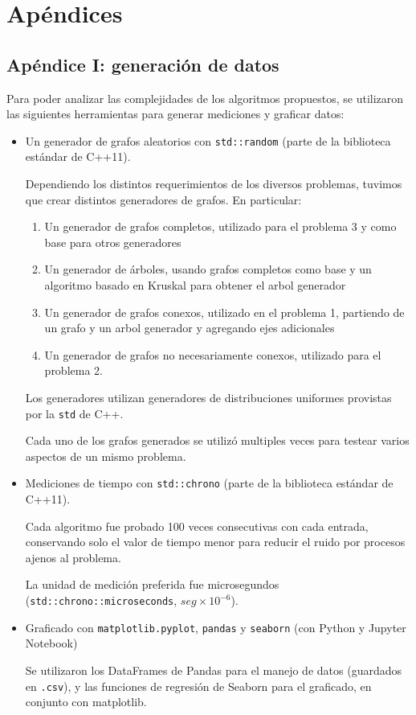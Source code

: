 \section{Apéndices}
	\subsection{Apéndice I: generación de datos}
	Para poder analizar las complejidades de los algoritmos propuestos, se utilizaron las siguientes herramientas para generar mediciones y graficar datos:

	\begin{itemize}
		\item Un generador de grafos aleatorios con \texttt{std::random} (parte de la biblioteca estándar de C++11).

		Dependiendo los distintos requerimientos de los diversos problemas, tuvimos que crear distintos generadores de grafos. En particular:

		\begin{enumerate}
			\item Un generador de grafos completos, utilizado para el problema 3 y como base para otros generadores
			\item Un generador de árboles, usando grafos completos como base y un algoritmo basado en Kruskal para obtener el arbol generador
			\item Un generador de grafos conexos, utilizado en el problema 1, partiendo de un grafo y un arbol generador y agregando ejes adicionales
			\item Un generador de grafos no necesariamente conexos, utilizado para el problema 2.
		\end{enumerate}

		Los generadores utilizan generadores de distribuciones uniformes provistas por la \texttt{std} de C++.

		Cada uno de los grafos generados se utilizó multiples veces para testear varios aspectos de un mismo problema.

		\item Mediciones de tiempo con \texttt{std::chrono} (parte de la biblioteca estándar de C++11).

		Cada algoritmo fue probado 100 veces consecutivas con cada entrada, conservando solo el valor de tiempo menor para reducir el ruido por procesos ajenos al problema.

		La unidad de medición preferida fue microsegundos (\texttt{std::chrono::microseconds}, $seg \times 10^{-6}$).

		\item Graficado con \texttt{matplotlib.pyplot}, \texttt{pandas} y \texttt{seaborn} (con Python y Jupyter Notebook)

		Se utilizaron los DataFrames de Pandas para el manejo de datos (guardados en \texttt{.csv}), y las funciones de regresión de Seaborn para el graficado, en conjunto con matplotlib.

	\end{itemize}

